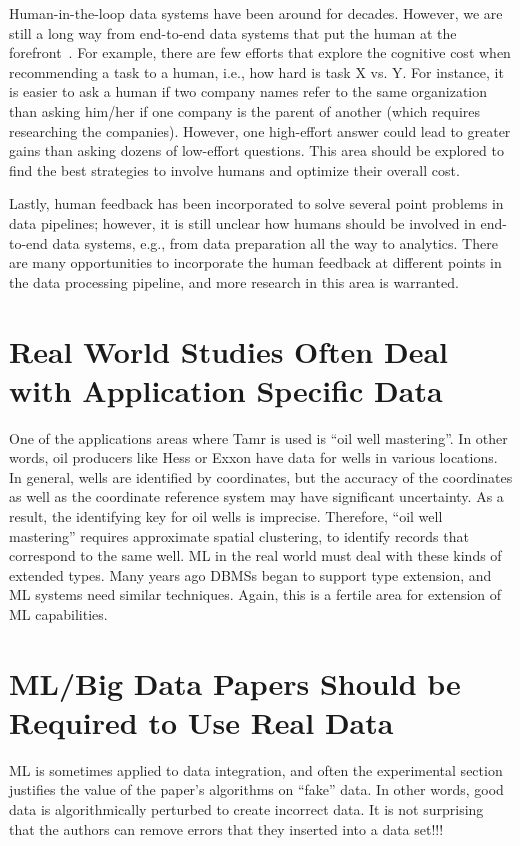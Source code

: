 \documentclass[11pt]{article}
\begin{document}
Human-in-the-loop data systems have been around for decades. However, we are still a long way from end-to-end data systems that put the human at the forefront~\cite{2}. For example, there are few efforts that explore the cognitive cost when recommending a task to a human, i.e., how hard is task X vs. Y. For instance, it is easier to ask a human if two company names refer to the same organization than asking him/her if one company is the parent of another (which requires researching the companies). However, one high-effort answer could lead to greater gains than asking dozens of low-effort questions. This area should be explored to find the best strategies to involve humans and optimize their overall cost.

Lastly, human feedback has been incorporated to solve several point problems in data pipelines; however, it is still unclear how humans should be involved in end-to-end data systems, e.g., from data preparation all the way to analytics. There are many opportunities to incorporate the human feedback at different points in the data processing pipeline, and more research in this area is warranted.

\section{Real World Studies Often Deal with Application Specific Data}

One of the applications areas where Tamr is used is “oil well mastering”.  In other words, oil producers like Hess or Exxon have data for wells in various locations.  In general, wells are identified by coordinates, but the accuracy of the coordinates as well as the coordinate reference system may have significant uncertainty.  As a result, the identifying key for oil wells is imprecise.  Therefore, “oil well mastering” requires approximate spatial clustering, to identify records that correspond to the same well.  ML in the real world must deal with these kinds of extended types.  Many years ago DBMSs began to support type extension, and ML systems need similar techniques.  Again, this is a fertile area for extension of ML capabilities.

\section{ML/Big Data Papers Should be Required to Use Real Data}

ML is sometimes applied to data integration, and often the experimental section justifies the value of the paper’s algorithms on “fake” data.  In other words, good data is algorithmically perturbed to create incorrect data.  It is not surprising that the authors can remove errors that they inserted into a data set!!!
\end{document}
